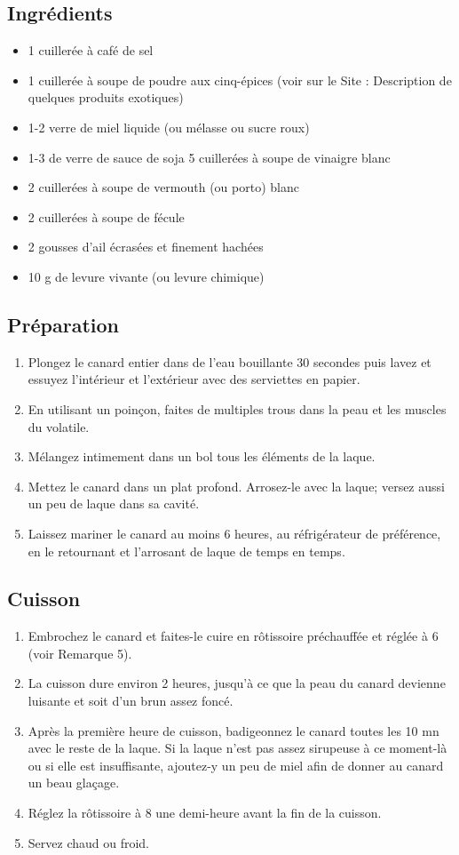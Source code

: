 \subsection*{Ingrédients}
\begin{itemize}
\item 1 cuillerée à café de sel
\item 1 cuillerée à soupe de poudre aux cinq-épices (voir sur le Site : Description de quelques produits exotiques)
\item 1-2 verre de miel liquide (ou mélasse ou sucre roux)
\item 1-3 de verre de sauce de soja 5 cuillerées à soupe de vinaigre blanc
\item 2 cuillerées à soupe de vermouth (ou porto) blanc
\item 2 cuillerées à soupe de fécule
\item 2 gousses d'ail écrasées et finement hachées
\item 10 g de levure vivante (ou levure chimique)
\end{itemize}

\subsection*{Préparation}
\begin{enumerate}
\item Plongez le canard entier dans de l'eau bouillante 30 secondes puis lavez et essuyez l'intérieur et l'extérieur avec des serviettes en papier.
\item En utilisant un poinçon, faites de multiples trous dans la peau et les muscles du volatile.
\item Mélangez intimement dans un bol tous les éléments de la laque.
\item Mettez le canard dans un plat profond. Arrosez-le avec la laque; versez aussi un peu de laque dans sa cavité.
\item Laissez mariner le canard au moins 6 heures, au réfrigérateur de préférence, en le retournant et l'arrosant de laque de temps en temps.
\end{enumerate}

\subsection*{Cuisson}
\begin{enumerate}
\item Embrochez le canard et faites-le cuire en rôtissoire préchauffée et réglée à 6 (voir Remarque 5).
\item La cuisson dure environ 2 heures, jusqu'à ce que la peau du canard devienne luisante et soit d'un brun assez foncé.
\item Après la première heure de cuisson, badigeonnez le canard toutes les 10 mn avec le reste de la laque. Si la laque n'est pas assez sirupeuse à ce moment-là ou si elle est insuffisante, ajoutez-y un peu de miel afin de donner au canard un beau glaçage.
\item Réglez la rôtissoire à 8 une demi-heure avant la fin de la cuisson.
\item Servez chaud ou froid.
\end{enumerate}

